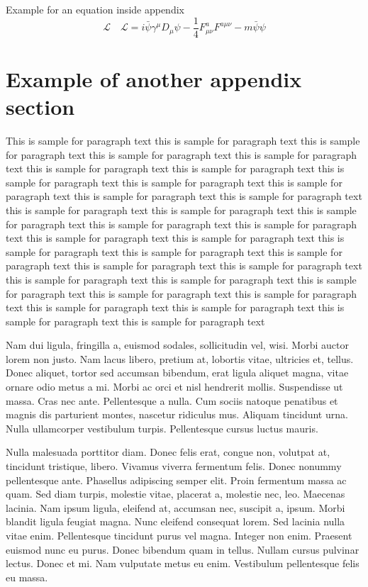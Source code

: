 \documentclass[AMS,STIX2COL]{WileyNJD-v2}
\begin{document}
    Example for an equation inside appendix
    \begin{equation}
        \mathcal{L}\quad \mathbf{\mathcal{L}} = i \bar{\psi} \gamma^\mu D_\mu \psi - \frac{1}{4} F_{\mu\nu}^a F^{a\mu\nu} - m \bar{\psi} \psi\label{eq25}
    \end{equation}


    \section{Example of another appendix section\label{app3}}%

    This is sample for paragraph text this is sample for paragraph text this is sample for paragraph text this is sample for paragraph text this is sample for paragraph text this is sample for paragraph text this is sample for paragraph text this is sample for paragraph text this is sample for paragraph text this is sample for paragraph text this is sample for paragraph text this is sample for paragraph text this is sample for paragraph text this is sample for paragraph text this is sample for paragraph text this is sample for paragraph text this is sample for paragraph text this is sample for paragraph text this is sample for paragraph text this is sample for paragraph text this is sample for paragraph text this is sample for paragraph text this is sample for paragraph text this is sample for paragraph text this is sample for paragraph text this is sample for paragraph text this is sample for paragraph text this is sample for paragraph text this is sample for paragraph text this is sample for paragraph text this is sample for paragraph text this is sample for paragraph text this is sample for paragraph text


    Nam dui ligula, fringilla a, euismod sodales, sollicitudin vel, wisi. Morbi auctor lorem non justo. Nam lacus libero,
    pretium at, lobortis vitae, ultricies et, tellus. Donec aliquet, tortor sed accumsan bibendum, erat ligula aliquet magna,
    vitae ornare odio metus a mi. Morbi ac orci et nisl hendrerit mollis. Suspendisse ut massa. Cras nec ante. Pellentesque
    a nulla. Cum sociis natoque penatibus et magnis dis parturient montes, nascetur ridiculus mus. Aliquam tincidunt
    urna. Nulla ullamcorper vestibulum turpis. Pellentesque cursus luctus mauris.

    Nulla malesuada porttitor diam. Donec felis erat, congue non, volutpat at, tincidunt tristique, libero. Vivamus
    viverra fermentum felis. Donec nonummy pellentesque ante. Phasellus adipiscing semper elit. Proin fermentum massa
    ac quam. Sed diam turpis, molestie vitae, placerat a, molestie nec, leo. Maecenas lacinia. Nam ipsum ligula, eleifend
    at, accumsan nec, suscipit a, ipsum. Morbi blandit ligula feugiat magna. Nunc eleifend consequat lorem. Sed lacinia
    nulla vitae enim. Pellentesque tincidunt purus vel magna. Integer non enim. Praesent euismod nunc eu purus. Donec
    bibendum quam in tellus. Nullam cursus pulvinar lectus. Donec et mi. Nam vulputate metus eu enim. Vestibulum
    pellentesque felis eu massa.
\end{document}
